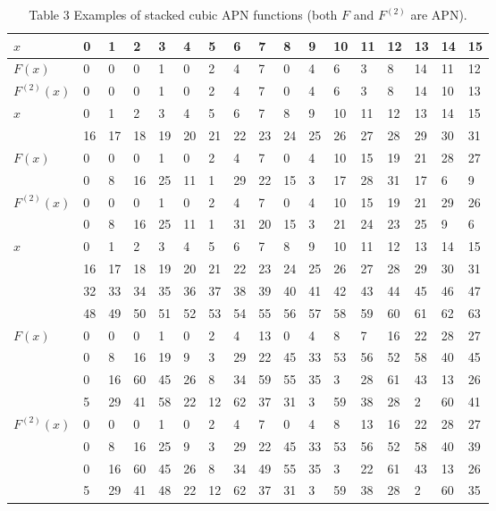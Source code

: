 \documentclass[10pt]{article}
\begin{document}
\begin{table}[h]
\begin{center}
\captionsetup{labelformat=empty}
\caption{Table 3 Examples of stacked cubic APN functions (both $F$ and $F^{(2)}$ are APN).}
\begin{tabular}{|l|l|l|l|l|l|l|l|l|l|l|l|l|l|l|l|l|}
\hline
$x$ & 0 & 1 & 2 & 3 & 4 & 5 & 6 & 7 & 8 & 9 & 10 & 11 & 12 & 13 & 14 & 15 \\
\hline
$F(x)$ & 0 & 0 & 0 & 1 & 0 & 2 & 4 & 7 & 0 & 4 & 6 & 3 & 8 & 14 & 11 & 12 \\
\hline
$F^{(2)}(x)$ & 0 & 0 & 0 & 1 & 0 & 2 & 4 & 7 & 0 & 4 & 6 & 3 & 8 & 14 & 10 & 13 \\
\hline
\multirow[t]{2}{*}{$x$} & 0 & 1 & 2 & 3 & 4 & 5 & 6 & 7 & 8 & 9 & 10 & 11 & 12 & 13 & 14 & 15 \\
\hline
 & 16 & 17 & 18 & 19 & 20 & 21 & 22 & 23 & 24 & 25 & 26 & 27 & 28 & 29 & 30 & 31 \\
\hline
\multirow[t]{2}{*}{$F(x)$} & 0 & 0 & 0 & 1 & 0 & 2 & 4 & 7 & 0 & 4 & 10 & 15 & 19 & 21 & 28 & 27 \\
\hline
 & 0 & 8 & 16 & 25 & 11 & 1 & 29 & 22 & 15 & 3 & 17 & 28 & 31 & 17 & 6 & 9 \\
\hline
\multirow[t]{2}{*}{$F^{(2)}(x)$} & 0 & 0 & 0 & 1 & 0 & 2 & 4 & 7 & 0 & 4 & 10 & 15 & 19 & 21 & 29 & 26 \\
\hline
 & 0 & 8 & 16 & 25 & 11 & 1 & 31 & 20 & 15 & 3 & 21 & 24 & 23 & 25 & 9 & 6 \\
\hline
\multirow[t]{4}{*}{$x$} & 0 & 1 & 2 & 3 & 4 & 5 & 6 & 7 & 8 & 9 & 10 & 11 & 12 & 13 & 14 & 15 \\
\hline
 & 16 & 17 & 18 & 19 & 20 & 21 & 22 & 23 & 24 & 25 & 26 & 27 & 28 & 29 & 30 & 31 \\
\hline
 & 32 & 33 & 34 & 35 & 36 & 37 & 38 & 39 & 40 & 41 & 42 & 43 & 44 & 45 & 46 & 47 \\
\hline
 & 48 & 49 & 50 & 51 & 52 & 53 & 54 & 55 & 56 & 57 & 58 & 59 & 60 & 61 & 62 & 63 \\
\hline
\multirow[t]{4}{*}{$F(x)$} & 0 & 0 & 0 & 1 & 0 & 2 & 4 & 13 & 0 & 4 & 8 & 7 & 16 & 22 & 28 & 27 \\
\hline
 & 0 & 8 & 16 & 19 & 9 & 3 & 29 & 22 & 45 & 33 & 53 & 56 & 52 & 58 & 40 & 45 \\
\hline
 & 0 & 16 & 60 & 45 & 26 & 8 & 34 & 59 & 55 & 35 & 3 & 28 & 61 & 43 & 13 & 26 \\
\hline
 & 5 & 29 & 41 & 58 & 22 & 12 & 62 & 37 & 31 & 3 & 59 & 38 & 28 & 2 & 60 & 41 \\
\hline
\multirow[t]{4}{*}{$F^{(2)}(x)$} & 0 & 0 & 0 & 1 & 0 & 2 & 4 & 7 & 0 & 4 & 8 & 13 & 16 & 22 & 28 & 27 \\
\hline
 & 0 & 8 & 16 & 25 & 9 & 3 & 29 & 22 & 45 & 33 & 53 & 56 & 52 & 58 & 40 & 39 \\
\hline
 & 0 & 16 & 60 & 45 & 26 & 8 & 34 & 49 & 55 & 35 & 3 & 22 & 61 & 43 & 13 & 26 \\
\hline
 & 5 & 29 & 41 & 48 & 22 & 12 & 62 & 37 & 31 & 3 & 59 & 38 & 28 & 2 & 60 & 35 \\
\hline
\end{tabular}
\end{center}
\end{table}
\end{document}
